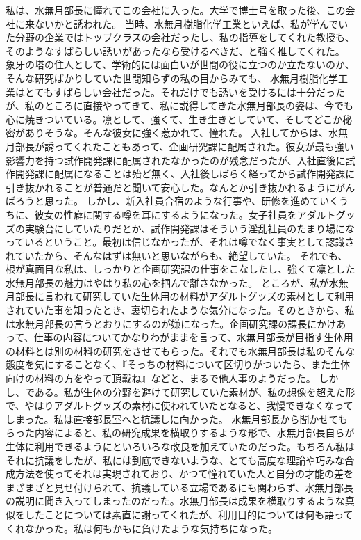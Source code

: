 私は、水無月部長に憧れてこの会社に入った。大学で博士号を取った後、この会社に来ないかと誘われた。
当時、水無月樹脂化学工業といえば、私が学んでいた分野の企業ではトップクラスの会社だったし、私の指導をしてくれた教授も、
そのようなすばらしい誘いがあったなら受けるべきだ、と強く推してくれた。
象牙の塔の住人として、学術的には面白いが世間の役に立つのか立たないのか、そんな研究ばかりしていた世間知らずの私の目からみても、
水無月樹脂化学工業はとてもすばらしい会社だった。それだけでも誘いを受けるには十分だったが、私のところに直接やってきて、私に説得してきた水無月部長の姿は、今でも心に焼きついている。凛として、強くて、生き生きとしていて、そしてどこか秘密がありそうな。そんな彼女に強く惹かれて、憧れた。
入社してからは、水無月部長が誘ってくれたこともあって、企画研究課に配属された。彼女が最も強い影響力を持つ試作開発課に配属されたなかったのが残念だったが、入社直後に試作開発課に配属になることは殆ど無く、入社後しばらく経ってから試作開発課に引き抜かれることが普通だと聞いて安心した。なんとか引き抜かれるようにがんばろうと思った。
しかし、新入社員合宿のような行事や、研修を進めていくうちに、彼女の性癖に関する噂を耳にするようになった。女子社員をアダルトグッズの実験台にしていたりだとか、試作開発課はそういう淫乱社員のたまり場になっているということ。最初は信じなかったが、それは噂でなく事実として認識されていたから、そんなはずは無いと思いながらも、絶望していた。
それでも、根が真面目な私は、しっかりと企画研究課の仕事をこなしたし、強くて凛とした水無月部長の魅力はやはり私の心を掴んで離さなかった。
ところが、私が水無月部長に言われて研究していた生体用の材料がアダルトグッズの素材として利用されていた事を知ったとき、裏切られたような気分になった。そのときから、私は水無月部長の言うとおりにするのが嫌になった。企画研究課の課長にかけあって、仕事の内容についてかなりわがままを言って、水無月部長が目指す生体用の材料とは別の材料の研究をさせてもらった。それでも水無月部長は私のそんな態度を気にすることなく、『そっちの材料について区切りがついたら、また生体向けの材料の方をやって頂戴ね』などと、まるで他人事のようだった。
しかし、である。私が生体の分野を避けて研究していた素材が、私の想像を超えた形で、やはりアダルトグッズの素材に使われていたとなると、我慢できなくなってしまった。私は直接部長室へと抗議しに向かった。
水無月部長から聞かせてもらった内容によると、私の研究成果を横取りするような形で、水無月部長自らが生体に利用できるようにといろいろな改良を加えていたのだった。もちろん私はそれに抗議をしたが、私には到底できないような、とても高度な理論や巧みな合成方法を使ってそれは実現されており、かつて憧れていた人と自分の才能の差をまざまざと見せ付けられて、抗議している立場であるにも関わらず、水無月部長の説明に聞き入ってしまったのだった。水無月部長は成果を横取りするような真似をしたことについては素直に謝ってくれたが、利用目的については何も語ってくれなかった。私は何もかもに負けたような気持ちになった。

